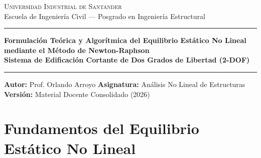 \documentclass[11pt,letterpaper]{article}
\begin{document}
\begin{center}
    {\scshape\Large Universidad Industrial de Santander}\\[0.2cm]
    {\large Escuela de Ingeniería Civil --- Posgrado en Ingeniería Estructural}\\[0.35cm]
    {\color{uispurple}\hrule height 2pt}\vspace{0.4cm}
    {\huge\bfseries\color{uisdark} Formulación Teórica y Algorítmica del Equilibrio Estático No Lineal mediante el Método de Newton-Raphson}\\[0.25cm]
    {\Large\bfseries\color{uispurple} Sistema de Edificación Cortante de Dos Grados de Libertad (2-DOF)}\\[0.35cm]
    {\color{uispurple}\hrule height 1pt}\vspace{0.35cm}
    {\textbf{Autor:} Prof. Orlando Arroyo}\quad\textbullet\quad
    {\textbf{Asignatura:} Análisis No Lineal de Estructuras}\quad\textbullet\quad
    {\textbf{Versión:} Material Docente Consolidado (2026)}
\end{center}

\vspace{0.2cm}

\begin{abstract}
\noindent El presente documento constituye una guía formal, matemática y computacionalmente rigurosa, para comprender la resolución del equilibrio estático no lineal en estructuras discretizadas. Se desarrolla en detalle la deducción del vector de desequilibrio residual $\mathbf{r}(\mathbf{u})$, la linealización mediante series de Taylor, el ensamblaje explícito de la matriz de rigidez tangente o Jacobiana $\mathbf{K}_t$, y la solución incremental-iterativa según el algoritmo de Newton-Raphson. La teoría se aplica paso a paso sobre un modelo físico de edificio cortante de dos pisos (\textit{shear building} 2-DOF) con constitutivas bilineales elasto-plásticas, ilustrando de manera analítica y gráfica la evolución cinemática, la plastificación secuencial de entrepisos y la extinción cuadrática del desequilibrio de fuerzas.
\end{abstract}

\vspace{0.2cm}

\section{Fundamentos del Equilibrio Estático No Lineal}
\end{document}
